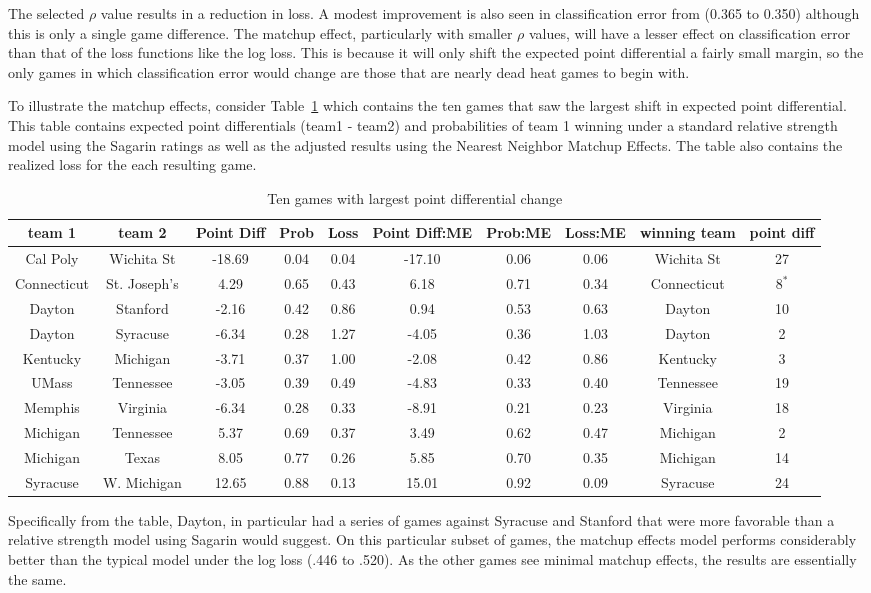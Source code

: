 The selected $\rho$ value results in a reduction in loss. A modest improvement is also seen in classification error from (0.365 to 0.350) although this is only a single game difference. The matchup effect, particularly with smaller $\rho$ values, will have a lesser effect on classification error than that of the loss functions like the log loss. This is because it will only shift the expected point differential a fairly small margin, so the only games in which classification error would change are those that are nearly dead heat games to begin with.

To illustrate the matchup effects, consider Table~\ref{tab:change} which contains the ten games that saw the largest shift in expected point differential. This table contains expected point differentials (team1 - team2) and probabilities of team 1 winning under a standard relative strength model using the Sagarin ratings as well as the adjusted results using the Nearest Neighbor Matchup Effects. The table also contains the realized loss for the each resulting game.
\begin{table}[h!]
\caption{Ten games with largest point differential change}
\tiny
\centering
\begin{tabular}{|cc | ccc | ccc | c|c|}
  \hline
  \hline
 team 1 & team 2 & Point Diff & Prob & Loss & Point Diff:ME & Prob:ME & Loss:ME & winning team &point diff\\ 
  \hline
 Cal Poly & Wichita St & -18.69 & 0.04 & 0.04 & -17.10 & 0.06 & 0.06 & Wichita St& 27\\ 
 Connecticut & St. Joseph's &4.29 & 0.65 & 0.43 & 6.18 & 0.71 & 0.34 & Connecticut & $8^*$\\ 
 Dayton & Stanford & -2.16 & 0.42 & 0.86 & 0.94 & 0.53 & 0.63 & Dayton& 10 \\ 
 Dayton & Syracuse & -6.34 & 0.28 & 1.27 & -4.05 & 0.36 & 1.03 & Dayton & 2\\ 
 Kentucky & Michigan & -3.71 & 0.37 & 1.00 & -2.08 & 0.42 & 0.86 & Kentucky & 3\\ 
 UMass & Tennessee &-3.05 & 0.39 & 0.49 & -4.83 & 0.33 & 0.40 & Tennessee &19\\ 
 Memphis & Virginia & -6.34 & 0.28 & 0.33 & -8.91 & 0.21 & 0.23 & Virginia & 18\\ 
 Michigan & Tennessee & 5.37 & 0.69 & 0.37 & 3.49 & 0.62 & 0.47 & Michigan&2\\ 
 Michigan & Texas & 8.05 & 0.77 & 0.26 & 5.85 & 0.70 & 0.35 & Michigan &14\\ 
 Syracuse & W. Michigan & 12.65 & 0.88 & 0.13 & 15.01 & 0.92 & 0.09 & Syracuse & 24\\ 
   \hline
   \hline
\end{tabular}
\label{tab:change}
\end{table}
Specifically from the table, Dayton, in particular had a series of games against Syracuse and Stanford that were more favorable than a relative strength model using Sagarin would suggest. On this particular subset of games, the matchup effects model performs considerably better than the typical model under the log loss (.446 to .520). As the other games see minimal matchup effects, the results are essentially the same.  